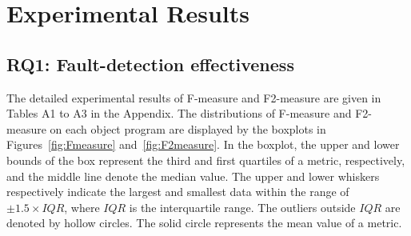 \documentclass[10pt,journal,compsoc]{IEEEtran}
\begin{document}
\section{Experimental Results}
\label{sec:results}

\subsection{RQ1: Fault-detection effectiveness}

The detailed experimental results of F-measure and F2-measure are given in Tables A1 to A3 in the Appendix. The distributions of F-measure and F2-measure on each object program are displayed by the boxplots in Figures~\ref{fig:Fmeasure} and~\ref{fig:F2measure}. In the boxplot, the upper and lower bounds of the box represent the third and first quartiles of a metric, respectively, and the middle line denote the median value. The upper and lower whiskers respectively indicate the largest and smallest data within the range of $\pm 1.5 \times IQR$, where $IQR$ is the interquartile range. The outliers outside $IQR$ are denoted by hollow circles. The solid circle represents the mean value of a metric.
\end{document}

